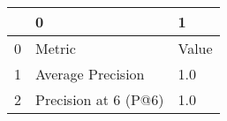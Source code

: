 \begin{tabular}{lll}
\toprule
{} &                     0 &      1 \\
\midrule
0 &                Metric &  Value \\
1 &     Average Precision &    1.0 \\
2 &  Precision at 6 (P@6) &    1.0 \\
\bottomrule
\end{tabular}
